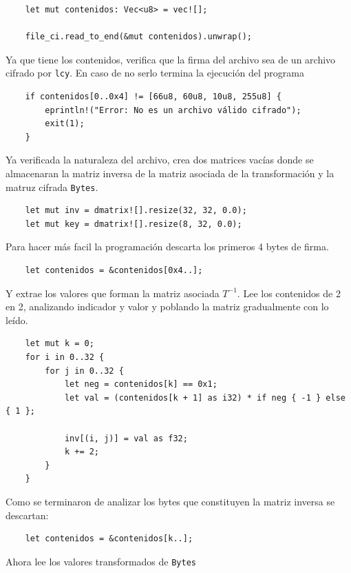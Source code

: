 \documentclass[a4paper]{article}
\begin{document}
\begin{verbatim}
    let mut contenidos: Vec<u8> = vec![];

    file_ci.read_to_end(&mut contenidos).unwrap();
\end{verbatim}

Ya que tiene los contenidos, verifica que la firma del archivo sea de un
archivo cifrado por \texttt{lcy}. En caso de no serlo termina la ejecución del
programa

\begin{verbatim}
    if contenidos[0..0x4] != [66u8, 60u8, 10u8, 255u8] {
        eprintln!("Error: No es un archivo válido cifrado");
        exit(1);
    }
\end{verbatim}

Ya verificada la naturaleza del archivo, crea dos matrices vacías donde se
almacenaran la matriz inversa de la matriz asociada de la transformación y la
matruz cifrada \texttt{Bytes}.

\begin{verbatim}
    let mut inv = dmatrix![].resize(32, 32, 0.0);
    let mut key = dmatrix![].resize(8, 32, 0.0);
\end{verbatim}

Para hacer más facil la programación descarta los primeros 4 bytes de firma.

\begin{verbatim}
    let contenidos = &contenidos[0x4..];
\end{verbatim}

Y extrae los valores que forman la matriz asociada $T^{-1}$. Lee los contenidos
de 2 en 2, analizando indicador y valor y poblando la matriz gradualmente con
lo leído.

\begin{verbatim}
    let mut k = 0;
    for i in 0..32 {
        for j in 0..32 {
            let neg = contenidos[k] == 0x1;
            let val = (contenidos[k + 1] as i32) * if neg { -1 } else { 1 };

            inv[(i, j)] = val as f32;
            k += 2;
        }
    }
\end{verbatim}

Como se terminaron de analizar los bytes que constituyen la matriz inversa se
descartan:

\begin{verbatim}
    let contenidos = &contenidos[k..];
\end{verbatim}

Ahora lee los valores transformados de \texttt{Bytes}
\end{document}
